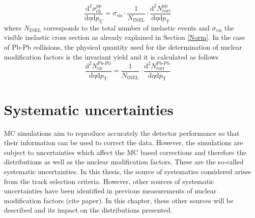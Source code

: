 \documentclass[12pt,a4paper]{report}
\begin{document}
\begin{equation}
\label{EqdiffCross}
\dfrac{\text{d}^2 \sigma^\text{pp}_\text{ch} }{\text{d}\eta \text{d}p_\text{T}} = \sigma_\text{vis} \cdot \dfrac{1}{N_\text{INEL}} \cdot \dfrac{\text{d}^2 N^\text{pp}	_\text{corr}}{\text{d}\eta \text{d}p_\text{T}}
\end{equation}
where $N_\text{INEL}$ corresponds to the total number of inelastic events and $\sigma_\text{vis}$ the visible inelastic cross section as already explained in Section \ref{Norm}. 
In the case of Pb-Pb collisions, the physical quantity used for the determination of nuclear modification factors is the invariant yield and it is calculated as follows
\begin{equation}
\label{Eqinyield}
\dfrac{\text{d}^2 N^\text{Pb-Pb}_\text{ch}}{\text{d}\eta \text{d}p_\text{T}} = \dfrac{1}{N_\text{INEL}} \cdot \dfrac{\text{d}^2 N^\text{Pb-Pb}_\text{corr}}{\text{d}\eta \text{d}p_\text{T}}
\end{equation}
\section{Systematic uncertainties}
MC simulations aim to reproduce accurately the detector performance so that their information can be used to correct the data. However, the simulations are subject to uncertainties which affect the MC based corrections and therefore the \pt distributions as well as the nuclear modification factors. These are the so-called systematic uncertainties. In this thesis, the source of systematics considered arises from the track selection criteria. However, other sources of systematic uncertainties have been identified in previous measurements of nuclear modification factors (cite paper). In this chapter, these other sources will be described and its impact on the \pt distributions presented.
\end{document}
